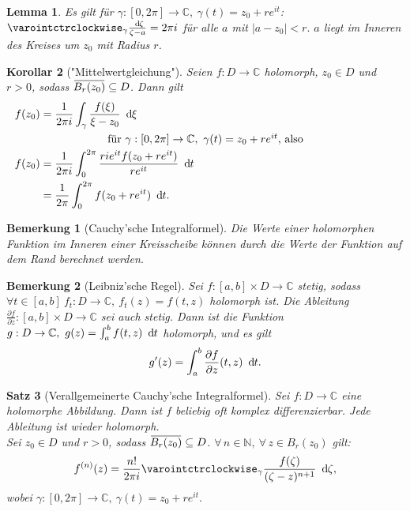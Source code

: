 \documentclass[a4paper,12pt]{article}
\theoremstyle{newthm}
\newtheorem{thm}{Satz}[subsection]
\newtheorem{lem}[thm]{Lemma}
\newtheorem{cor}[thm]{Korollar}
\theoremstyle{newdef}
\theoremstyle{newrem}
\newtheorem*{rem}{Bemerkung}
\newcommand{\N}{\mathbb{N}}
\newcommand{\C}{\mathbb{C}}
\renewcommand{\d}{\ \operatorname{d}\hspace{-2px}}
\newcommand{\del}{\partial}
\newcommand{\overbar}[1]{\mkern 1.5mu\overline{\mkern-1.5mu#1\mkern-1.5mu}\mkern 1.5mu}
\begin{document}
		\begin{lem}
			Es gilt für $ \gamma: [0,2\pi] \to \C,\ \gamma(t) = z_0 + re^{it} $: $ \varointctrclockwise_\gamma \frac{\d \zeta}{\zeta - a} = 2\pi i $ für alle $a$ mit $ |a-z_0| < r. $ $a$ liegt im Inneren des Kreises um $z_0$ mit Radius $r$.
		\end{lem}
		
		\begin{cor}["Mittelwertgleichung"]
			Seien $ f: D \to \C $ holomorph, $ z_0 \in D $ und $ r > 0 $, sodass $ \overbar{B_r(z_0)} \subseteq D $. Dann gilt
			\begin{align*}
				f(z_0) &= \frac{1}{2\pi i} \int_\gamma \frac{f(\xi)}{\xi - z_0} \d \xi\\
				\noalign{\centering für $ \gamma: [0,2\pi] \to \C,\ \gamma(t) = z_0 + re^{it} $, also}
				f(z_0) &= \frac{1}{2\pi i} \int_0^{2\pi} \frac{rie^{it} f(z_0+re^{it})}{re^{it}} \d t\\
				&= \frac{1}{2\pi} \int_0^{2\pi} f(z_0+re^{it}) \d t.
			\end{align*}
		\end{cor}
		
		\begin{rem}[Cauchy'sche Integralformel]
			Die Werte einer holomorphen Funktion im Inneren einer Kreisscheibe können durch die Werte der Funktion auf dem Rand berechnet werden.
		\end{rem}
		
		\begin{rem}[Leibniz'sche Regel]
			Sei $ f: [a,b]\times D \to \C $ stetig, sodass $ \forall t \in [a,b]\ f_t: D \to \C,\ f_t(z) = f(t,z) $ holomorph ist. Die Ableitung $ \frac{\del f}{\del z}: [a,b]\times D \to \C $ sei auch stetig. Dann ist die Funktion $ g: D \to \C,\ g(z) = \int_a^b f(t,z) \d t $ holomorph, und es gilt
			\[ g'(z) = \int_a^b \frac{\del f}{\del z}(t,z)\d t. \]
		\end{rem}
		
		\begin{thm}[Verallgemeinerte Cauchy'sche Integralformel]\label{2.3.6}
			Sei $ f: D \to \C $ eine holomorphe Abbildung. Dann ist $f$ beliebig oft komplex differenzierbar. Jede Ableitung ist wieder holomorph.\\
			Sei $ z_0 \in D $ und $r>0$, sodass $ \overbar{B_r(z_0)} \subseteq D $. $ \forall\,n \in \N,\ \forall\, z \in B_r(z_0) $ gilt:
			\[ f^{(n)}(z) = \frac{n!}{2 \pi i} \varointctrclockwise_\gamma \frac{f(\zeta)}{(\zeta-z)^{n+1}} \d \zeta, \]
			wobei $ \gamma: [0,2\pi] \to \C,\ \gamma(t) = z_0 + re^{it}. $
		\end{thm}
		
\end{document}

